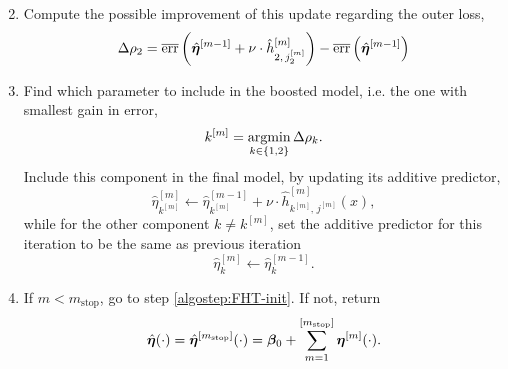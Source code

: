 \begin{algorithm}
\begin{enumerate}
\begin{equation*}
        \end{equation*}
    \item
        Compute the possible improvement of this update regarding the outer loss,
        \begin{equation*}
            \Delta\rho_2=\overline{\text{err}}\left(\hat{\boldsymbol{\eta}}^{[m-1]} + \nu \cdot \hat{h}^{[m]}_{2,\,j_2^{[m]}} \right)-\overline{\text{err}}\left(\hat{\boldsymbol{\eta}}^{[m-1]}  \right)
        \end{equation*}
    \item
    \label{algostep:FHT-end}
        Find which parameter to include in the boosted model, i.e. the one with smallest gain in error,
        \begin{equation*}
            k^{[m]}=\operatorname*{argmin}_{k\in\{1,2\}}\Delta\rho_k.
        \end{equation*}
        Include this component in the final model, by updating its additive predictor,
        \begin{equation*}
            \hat{\eta}^{[m]}_{k^{[m]}}\gets\hat{\eta}^{[m-1]}_{k^{[m]}}+\nu\cdot\hat{h}^{[m]}_{k^{[m]},\,j^{[m]}}(x),
        \end{equation*}
        while for the other component $k\neq k^{[m]}$, set the additive predictor for this iteration to be the same as previous iteration
        \begin{equation*}
            \hat{\eta}^{[m]}_{k}\gets\hat{\eta}^{[m-1]}_{k}.
        \end{equation*}
    \item
        If $m<m_{\text{stop}}$, go to step \ref{algostep:FHT-init}.
        If not, return
        \begin{equation*}
            \hat{\boldsymbol{\eta}}(\cdot)=\hat{\boldsymbol{\eta}}^{[m_{\text{stop}}]}(\cdot)=\boldsymbol{\beta}_0+\sum_{m=1}^{[m_{\text{stop}}]}\boldsymbol{\eta}^{[m]}(\cdot).
        \end{equation*}
\end{enumerate}
\end{algorithm}

